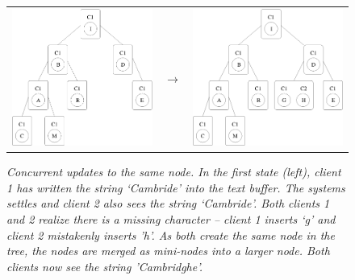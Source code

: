 \documentclass[12pt,a4paper,twoside,openright]{report}
\begin{document}
\begin{figure}[htb]
\centering
  \begin{tabular}{ >{\centering}m{6cm} >{\centering}m{15mm} >{\centering\arraybackslash}m{6cm} }
    \includegraphics[width=1\linewidth]{figs/treedoc_1.eps}  &
    $\longrightarrow$  &
    \includegraphics[width=1\linewidth]{figs/treedoc_2.eps}
  \end{tabular}
\caption{\textit{Concurrent updates to the same node. In the first state (left), client 1 has written the string `Cambride' into the text buffer. The systems settles and client 2 also sees the string `Cambride'. Both clients 1 and 2 realize there is a missing character -- client 1 inserts `g' and client 2 mistakenly inserts 'h'. As both create the same node in the tree, the nodes are merged as mini-nodes into a larger node. Both clients now see the string 'Cambridghe'.}}
\label{treedoc}
\end{figure}
\end{document}
